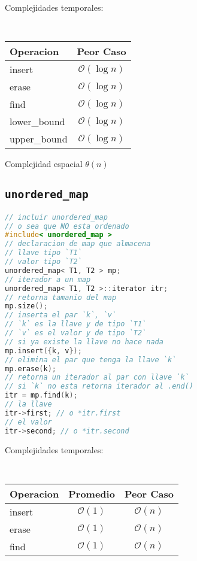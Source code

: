 \documentclass{article}
\newcommand{\bigO}{\mathcal{O}}
\begin{document}
\begin{multicols}{2}
Complejidades temporales:
\begin{table}[H]
  \tt \scriptsize
  \begin{center}
    \begin{tabular}[c]{l|c}
      \hline
      Operacion & Peor Caso \\
      \hline
      insert & $\bigO(\log n)$ \\
      \hline
      erase & $\bigO(\log n)$ \\
      \hline
      find & $\bigO(\log n)$ \\
      \hline
      lower\_bound & $\bigO(\log n)$ \\
      \hline
      upper\_bound & $\bigO(\log n)$ \\
      \hline
    \end{tabular}
  \end{center}
\end{table}

Complejidad espacial $\theta(n)$


\subsection*{\tt\footnotesize unordered\_map}
\begin{lstlisting}[language=C++]
// incluir unordered_map
// o sea que NO esta ordenado
#include< unordered_map >
// declaracion de map que almacena
// llave tipo `T1`
// valor tipo `T2`
unordered_map< T1, T2 > mp;
// iterador a un map
unordered_map< T1, T2 >::iterator itr;
// retorna tamanio del map
mp.size();
// inserta el par `k`, `v`
// `k` es la llave y de tipo `T1`
// `v` es el valor y de tipo `T2`
// si ya existe la llave no hace nada
mp.insert({k, v});
// elimina el par que tenga la llave `k`
mp.erase(k);
// retorna un iterador al par con llave `k`
// si `k` no esta retorna iterador al .end()
itr = mp.find(k);
// la llave
itr->first; // o *itr.first
// el valor
itr->second; // o *itr.second
\end{lstlisting}

Complejidades temporales:
\begin{table}[H]
  \tt \scriptsize
  \begin{center}
    \begin{tabular}[c]{l|c|c}
      \hline
      Operacion & Promedio & Peor Caso\\
      \hline
      insert & $\bigO(1)$ & $\bigO(n)$ \\
      \hline
      erase & $\bigO(1)$ & $\bigO(n)$\\
      \hline
      find & $\bigO(1)$ & $\bigO(n)$\\
      \hline
    \end{tabular}
  \end{center}
\end{table}


\end{multicols}
\end{document}
